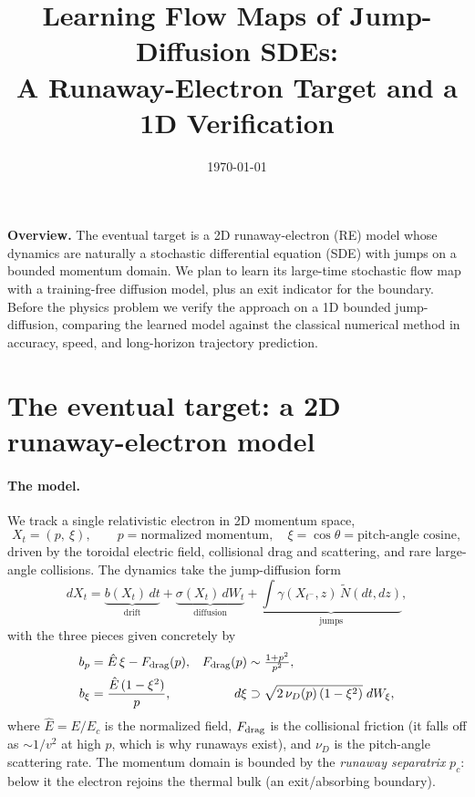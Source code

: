 \documentclass[11pt]{article}
\title{Learning Flow Maps of Jump-Diffusion SDEs:\\
A Runaway-Electron Target and a 1D Verification}
\author{}
\date{\today}
\begin{document}
\maketitle

\noindent\textbf{Overview.} The eventual target is a 2D runaway-electron (RE)
model whose dynamics are naturally a stochastic differential equation (SDE) with
jumps on a bounded momentum domain. We plan to learn its large-time stochastic
flow map with a training-free diffusion model, plus an exit indicator for the
boundary. Before the physics problem we verify the approach on a 1D bounded
jump-diffusion, comparing the learned model against the classical numerical
method in accuracy, speed, and long-horizon trajectory prediction.

\section{The eventual target: a 2D runaway-electron model}

\paragraph{The model.} We track a single relativistic electron in 2D momentum
space,
\begin{equation}
X_t = (p,\ \xi), \qquad p=\text{normalized momentum}, \quad
\xi=\cos\theta=\text{pitch-angle cosine},
\end{equation}
driven by the toroidal electric field, collisional drag and scattering, and rare
large-angle collisions. The dynamics take the jump-diffusion form
\begin{equation}
\label{eq:jdsde}
dX_t = \underbrace{b(X_t)\,dt}_{\text{drift}}
     + \underbrace{\sigma(X_t)\,dW_t}_{\text{diffusion}}
     + \underbrace{\int \gamma(X_{t^-},z)\,\tilde N(dt,dz)}_{\text{jumps}},
\end{equation}
with the three pieces given concretely by
\begin{align}
b_p &= \hat E\,\xi - F_{\rm drag}(p), &
F_{\rm drag}(p) &\sim \tfrac{1+p^2}{p^2}, \\
b_\xi &= \frac{\hat E\,(1-\xi^2)}{p}, &
d\xi &\supset \sqrt{2\,\nu_D(p)\,(1-\xi^2)}\;dW_\xi ,
\end{align}
where $\hat E=E/E_c$ is the normalized field, $F_{\rm drag}$ is the collisional
friction (it falls off as $\sim 1/v^2$ at high $p$, which is why runaways exist),
and $\nu_D$ is the pitch-angle scattering rate. The momentum domain is bounded by
the \emph{runaway separatrix} $p_c$: below it the electron rejoins the thermal
bulk (an exit/absorbing boundary).
\end{document}
